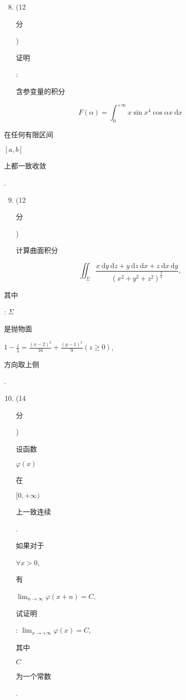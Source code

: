\documentclass[10pt]{article}
\begin{document}
\begin{enumerate}
  \setcounter{enumi}{7}
  \item (12 \begin{CJK}{UTF8}{mj}分\end{CJK}) \begin{CJK}{UTF8}{mj}证明\end{CJK}: \begin{CJK}{UTF8}{mj}含参变量的积分\end{CJK}
\end{enumerate}
$$
F(\alpha)=\int_{0}^{+\infty} x \sin x^{4} \cos \alpha x \mathrm{~d} x
$$
\begin{CJK}{UTF8}{mj}在任何有限区间\end{CJK} $[a, b]$ \begin{CJK}{UTF8}{mj}上都一致收敛\end{CJK}.

\begin{enumerate}
  \setcounter{enumi}{8}
  \item (12 \begin{CJK}{UTF8}{mj}分\end{CJK}) \begin{CJK}{UTF8}{mj}计算曲面积分\end{CJK}
\end{enumerate}
$$
\iint_{\Sigma} \frac{x \mathrm{~d} y \mathrm{~d} z+y \mathrm{~d} z \mathrm{~d} x+z \mathrm{~d} x \mathrm{~d} y}{\left(x^{2}+y^{2}+z^{2}\right)^{\frac{3}{2}}},
$$
\begin{CJK}{UTF8}{mj}其中\end{CJK}: $\Sigma$ \begin{CJK}{UTF8}{mj}是抛物面\end{CJK} $1-\frac{z}{5}=\frac{(x-2)^{2}}{16}+\frac{(y-1)^{2}}{9}(z \geqslant 0)$, \begin{CJK}{UTF8}{mj}方向取上侧\end{CJK}.

\begin{enumerate}
  \setcounter{enumi}{9}
  \item (14 \begin{CJK}{UTF8}{mj}分\end{CJK}) \begin{CJK}{UTF8}{mj}设函数\end{CJK} $\varphi(x)$ \begin{CJK}{UTF8}{mj}在\end{CJK} $[0,+\infty)$ \begin{CJK}{UTF8}{mj}上一致连续\end{CJK}. \begin{CJK}{UTF8}{mj}如果对于\end{CJK} $\forall x>0$, \begin{CJK}{UTF8}{mj}有\end{CJK} $\lim _{n \rightarrow \infty} \varphi(x+n)=C$, \begin{CJK}{UTF8}{mj}试证明\end{CJK}: $\lim _{x \rightarrow+\infty} \varphi(x)=C$, \begin{CJK}{UTF8}{mj}其中\end{CJK} $C$ \begin{CJK}{UTF8}{mj}为一个常数\end{CJK}.
\end{enumerate}
\end{document}
